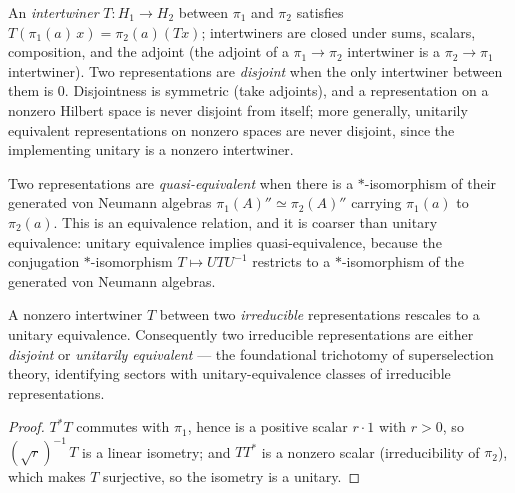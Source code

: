 \begin{definition}
    \label{def:disjoint-representations}
    \leanok
    An \emph{intertwiner} $T : H_1 \to H_2$ between $\pi_1$ and $\pi_2$ satisfies $T(\pi_1(a)\,x) = \pi_2(a)(T x)$; intertwiners are closed under sums, scalars, composition, and the adjoint (the adjoint of a $\pi_1 \to \pi_2$ intertwiner is a $\pi_2 \to \pi_1$ intertwiner). Two representations are \emph{disjoint} when the only intertwiner between them is $0$. Disjointness is symmetric (take adjoints), and a representation on a nonzero Hilbert space is never disjoint from itself; more generally, unitarily equivalent representations on nonzero spaces are never disjoint, since the implementing unitary is a nonzero intertwiner.
\end{definition}

\begin{definition}
    \label{def:quasi-equivalence}
    \leanok
    Two representations are \emph{quasi-equivalent} when there is a $*$-isomorphism of their generated von Neumann algebras $\pi_1(A)'' \simeq \pi_2(A)''$ carrying $\pi_1(a)$ to $\pi_2(a)$. This is an equivalence relation, and it is coarser than unitary equivalence: unitary equivalence implies quasi-equivalence, because the conjugation $*$-isomorphism $T \mapsto U T U^{-1}$ restricts to a $*$-isomorphism of the generated von Neumann algebras.
\end{definition}

\begin{theorem}
    \label{thrm:irreducible-dichotomy}
    \leanok
    A nonzero intertwiner $T$ between two \emph{irreducible} representations rescales to a unitary equivalence. Consequently two irreducible representations are either \emph{disjoint} or \emph{unitarily equivalent} --- the foundational trichotomy of superselection theory, identifying sectors with unitary-equivalence classes of irreducible representations.
\end{theorem}
\begin{proof}
    \leanok
    $T^\ast T$ commutes with $\pi_1$, hence is a positive scalar $r \cdot 1$ with $r > 0$, so $(\sqrt r)^{-1}\,T$ is a linear isometry; and $T T^\ast$ is a nonzero scalar (irreducibility of $\pi_2$), which makes $T$ surjective, so the isometry is a unitary.
\end{proof}

